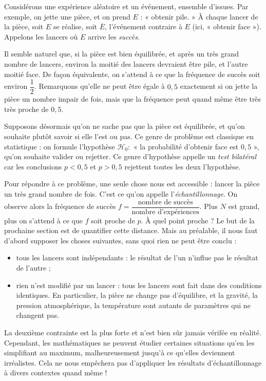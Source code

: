 Considérons une expérience aléatoire et un événement, ensemble d'issues.
Par exemple, on jette une pièce, et on prend $E$ : « obtenir pile. »
À chaque lancer de la pièce, soit $E$ se réalise, soit $\overline{E}$, l'événement contraire à $E$ (ici, « obtenir face »).
Appelons les lancers où $E$ arrive les \emph{succès}.

Il semble naturel que, si la pièce est bien équilibrée, et après un très grand nombre de lancers, environ la moitié des lancers devraient être pile, et l'autre moitié face.
De façon équivalente, on s'attend à ce que la fréquence de succès soit environ $\dfrac12$.
Remarquons qu'elle ne peut être égale à $0,5$ exactement si on jette la pièce un nombre impair de fois, mais que la fréquence peut quand même être très très proche de $0,5$.

Supposons désormais qu'on ne sache pas que la pièce est équilibrée, et qu'on souhaite plutôt savoir si elle l'est ou pas.
Ce genre de problème est classique en statistique : on formule l'hypothèse $\mathcal{H}_0 :$ « la probabilité d'obtenir face est $0,5$ », qu'on souhaite valider ou rejetter.
Ce genre d'hypothèse appelle un \emph{test bilatéral} car les conclusions $p< 0,5$ et $p>0,5$ rejettent toutes les deux l'hypothèse.

Pour répondre à ce problème, une seule chose nous est accessible : lancer la pièce un très grand nombre de fois.
C'est ce qu'on appelle l'\emph{échantillonnage}.
On observe alors la fréquence de succès $f = \dfrac{\text{nombre de succès}}{\text{nombre d'expériences}}$.
Plus $N$ est grand, plus on s'attend à ce que $f$ soit proche de $p$. À quel point proche ? Le but de la prochaine section est de quantifier cette distance.
Mais au préalable, il nous faut d'abord supposer les choses suivantes, sans quoi rien ne peut être conclu :
	\begin{itemize}
		\item tous les lancers sont indépendants : le résultat de l'un n'influe pas le résultat de l'autre ;
		\item rien n'est modifié par un lancer : tous les lancers sont fait dans des conditions identiques. En particulier, la pièce ne change pas d'équilibre, et la gravité, la pression atmosphérique, la température sont autants de paramètres qui ne changent pas.
	\end{itemize}
La deuxième contrainte est la plus forte et n'est bien sûr jamais vérifée en réalité.
Cependant, les mathématiques ne peuvent étudier certaines situations qu'en les simplifiant au maximum, malheureusement jusqu'à ce qu'elles deviennent irréalistes.
Cela ne nous empêchera pas d'appliquer les résultats d'échantillonnage à divers contextes quand même !


